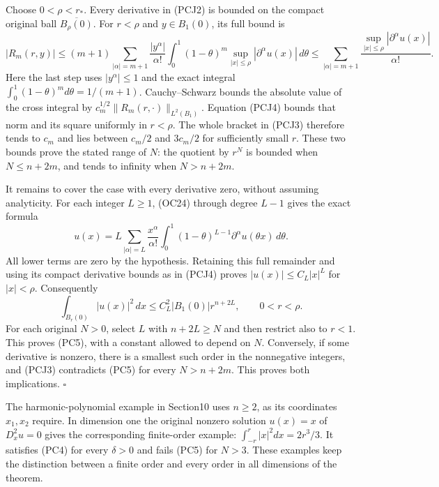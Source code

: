 \documentclass[
  11pt,
]{article}
\makeatletter
\let\ReaderOriginalAnchorStart\hyper@anchorstart
\let\ReaderOriginalAnchorEnd\hyper@anchorend
\let\ReaderPendingAliases\@empty
\def\ReaderArmAliases#1{\gdef\ReaderPendingAliases{#1}}
\def\hyper@anchorstart#1{\ReaderIfNativeAnchorTF{#1}{\ReaderPendingAliases\global\let\ReaderPendingAliases\@empty}{}\ReaderOriginalAnchorStart{#1}}
\makeatother
\begin{document}
Choose \(0<\rho<r_*\). Every derivative in (PCJ2) is bounded on the
compact original ball \(\overline{B_\rho(0)}\). For \(r<\rho\) and
\(y\in B_1(0)\), its full bound is \[
 |R_m(r,y)|\leq
 (m+1)\sum_{|\alpha|=m+1}\frac{|y^\alpha|}{\alpha!}
   \int_0^1(1-\theta)^m
       \sup_{|x|\leq\rho}|\partial^\alpha u(x)|\,d\theta
 \leq\sum_{|\alpha|=m+1}\frac{\sup_{|x|\leq\rho}|\partial^\alpha u(x)|}{\alpha!}.
                                                        \tag{PCJ4}
\] Here the last step uses \(|y^\alpha|\leq1\) and the exact integral
\(\int_0^1(1-\theta)^m d\theta=1/(m+1)\). Cauchy--Schwarz bounds the
absolute value of the cross integral by
\(c_m^{1/2}\|R_m(r,\cdot)\|_{L^2(B_1)}\). Equation (PCJ4) bounds that
norm and its square uniformly in \(r<\rho\). The whole bracket in (PCJ3)
therefore tends to \(c_m\) and lies between \(c_m/2\) and \(3c_m/2\) for
sufficiently small \(r\). These two bounds prove the stated range of
\(N\): the quotient by \(r^N\) is bounded when \(N\leq n+2m\), and tends
to infinity when \(N>n+2m\).

It remains to cover the case with every derivative zero, without
assuming analyticity. For each integer \(L\geq1\), (OC24) through degree
\(L-1\) gives the exact formula \[
 u(x)=L\sum_{|\alpha|=L}\frac{x^\alpha}{\alpha!}
       \int_0^1(1-\theta)^{L-1}\partial^\alpha u(\theta x)\,d\theta.
                                                        \tag{PCJ5}
\] All lower terms are zero by the hypothesis. Retaining this full
remainder and using its compact derivative bounds as in (PCJ4) proves
\(|u(x)|\leq C_L|x|^L\) for \(|x|<\rho\). Consequently \[
 \int_{B_r(0)}|u(x)|^2\,dx
       \leq C_L^2|B_1(0)|r^{n+2L},\qquad0<r<\rho.        \tag{PCJ6}
\] For each original \(N>0\), select \(L\) with \(n+2L\geq N\) and then
restrict also to \(r<1\). This proves (PC5), with a constant allowed to
depend on \(N\). Conversely, if some derivative is nonzero, there is a
smallest such order in the nonnegative integers, and (PCJ3) contradicts
(PC5) for every \(N>n+2m\). This proves both implications. \(\square\)

The harmonic-polynomial example in Section10 uses \(n\geq2\), as its
coordinates \(x_1,x_2\) require. In dimension one the original nonzero
solution \(u(x)=x\) of \(D_x^2u=0\) gives the corresponding finite-order
example: \(\int_{-r}^r|x|^2dx=2r^3/3\). It satisfies (PC4) for every
\(\delta>0\) and fails (PC5) for \(N>3\). These examples keep the
distinction between a finite order and every order in all dimensions of
the theorem.

\ReaderArmAliases{\ReaderOriginalAnchorStart{AN03-PCU-010}\ReaderOriginalAnchorEnd\begingroup\expandafter\def\csname @currentHref\endcsname{AN03-PCU-010}\label{AN03-PCU-010}\endgroup\ReaderOriginalAnchorStart{an03-pcu-010-examples-exercises-and-full-solutions}\ReaderOriginalAnchorEnd\begingroup\expandafter\def\csname @currentHref\endcsname{an03-pcu-010-examples-exercises-and-full-solutions}\label{an03-pcu-010-examples-exercises-and-full-solutions}\endgroup\ReaderOriginalAnchorStart{10-examples-exercises-and-full-solutions}\ReaderOriginalAnchorEnd\begingroup\expandafter\def\csname @currentHref\endcsname{10-examples-exercises-and-full-solutions}\label{10-examples-exercises-and-full-solutions}\endgroup\ReaderOriginalAnchorStart{examples-exercises-and-full-solutions}\ReaderOriginalAnchorEnd}
\end{document}
